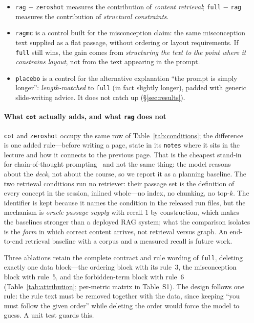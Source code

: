 \documentclass[review,12pt]{elsarticle}
\renewcommand{\_}{\kgunderscore\allowbreak}
\newcommand{\id}[1]{\texttt{#1}}
\begin{document}
\begin{itemize}
  \item \id{rag} $-$ \id{zero\_shot} measures the contribution of \emph{content
  retrieval}; \id{full} $-$ \id{rag} measures the contribution of
  \emph{structural constraints}.
  \item \id{rag\_mc} is a control built for the misconception claim: the same
  misconception text supplied as a flat passage, without ordering or layout
  requirements. If \id{full} still wins, the gain comes from \emph{structuring
  the text to the point where it constrains layout}, not from the text appearing
  in the prompt.
  \item \id{placebo} is a control for the alternative explanation ``the prompt
  is simply longer'': \emph{length-matched} to \id{full} (in fact slightly
  longer), padded with generic slide-writing advice. It does not catch up
  (\S\ref{sec:results}).
\end{itemize}

\paragraph{What \id{cot} actually adds, and what \id{rag} does not}
\id{cot} and \id{zero\_shot} occupy the same row of
Table~\ref{tab:conditions}; the difference is one added rule---before writing a
page, state in its \id{notes} where it sits in the lecture and how it connects
to the previous page. That is the cheapest stand-in for chain-of-thought
prompting~\cite{wei2022cot,yao2023react} and not the same thing: the model
reasons about the \emph{deck}, not about the course, so we report it as a
planning baseline. The two retrieval conditions run no retriever: their passage
set is the definition of every concept in the session, inlined whole---no
index, no chunking, no top-$k$. The identifier is kept because it names the
condition in the released run files, but the mechanism is \emph{oracle passage
supply} with recall 1 by construction, which makes the baselines stronger than
a deployed RAG system; what the comparison isolates is the \emph{form} in
which correct content arrives, not retrieval versus graph. An end-to-end
retrieval baseline with a corpus and a measured recall is future work.

Three ablations retain the complete contract and rule wording of \id{full},
deleting exactly one data block---the ordering block with its rule~3, the
misconception block with rule~5, and the forbidden-term block with rule~6
(Table~\ref{tab:attribution}; per-metric matrix in Table~S1). The design
follows one rule: the rule text must be removed together with the data, since
keeping ``you must follow the given order'' while deleting the order would
force the model to guess. A unit test guards this.
\end{document}
